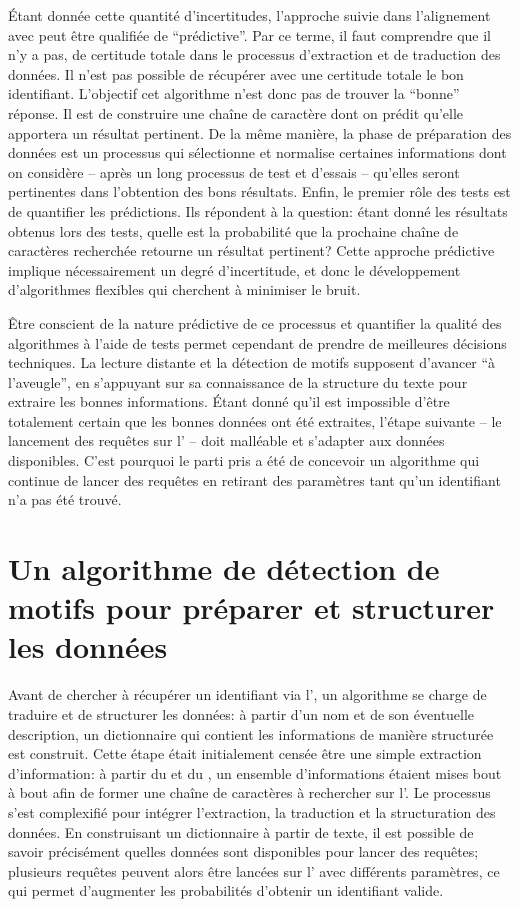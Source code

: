 Étant donnée cette quantité d'incertitudes, l'approche suivie dans l'alignement avec \wkd{} peut être qualifiée de \enquote{prédictive}. Par ce terme, il faut comprendre que il n'y a pas, de certitude totale dans le processus d'extraction et de traduction des données. Il n'est pas possible de récupérer avec une certitude totale le bon identifiant. L'objectif cet algorithme n'est donc pas de trouver la \enquote{bonne} réponse. Il est de construire une chaîne de caractère dont on prédit qu'elle apportera un résultat pertinent. De la même manière, la phase de préparation des données est un processus qui sélectionne et normalise certaines informations dont on considère -- après un long processus de test et d'essais -- qu'elles seront pertinentes dans l'obtention des bons résultats. Enfin, le premier rôle des tests est de quantifier les prédictions. Ils répondent à la question: étant donné les résultats obtenus lors des tests, quelle est la probabilité que la prochaine chaîne de caractères recherchée retourne un résultat pertinent? Cette approche prédictive implique nécessairement un degré d'incertitude, et donc le développement d'algorithmes flexibles qui cherchent à minimiser le bruit. 

Être conscient de la nature prédictive de ce processus et quantifier la qualité des algorithmes à l'aide de tests permet cependant de prendre de meilleures décisions techniques. La lecture distante et la détection de motifs supposent d'avancer \enquote{à l'aveugle}, en s'appuyant sur sa connaissance de la structure du texte pour extraire les bonnes informations. Étant donné qu'il est impossible d'être totalement certain que les bonnes données ont été extraites, l'étape suivante -- le lancement des requêtes sur l'\api{} -- doit malléable et s'adapter aux données disponibles. C'est pourquoi le parti pris a été de concevoir un algorithme qui continue de lancer des requêtes en retirant des paramètres tant qu'un identifiant n'a pas été trouvé.

\section{Un algorithme de détection de motifs pour préparer et structurer les données}
Avant de chercher à récupérer un identifiant \wkd{} via l'\api{}, un algorithme se charge de traduire et de structurer les données: à partir d'un nom et de son éventuelle description, un dictionnaire qui contient les informations de manière structurée est construit. Cette étape était initialement censée être une simple extraction d'information: à partir du \tname{} et du \ttrait{}, un ensemble d'informations étaient mises bout à bout afin de former une chaîne de caractères à rechercher sur l'\api{}. Le processus s'est complexifié pour intégrer l'extraction, la traduction et la structuration des données. En construisant un \gls{dictionnaire} à partir de texte, il est possible de savoir précisément quelles données sont disponibles pour lancer des requêtes; plusieurs requêtes peuvent alors être lancées sur l'\api{} avec différents paramètres, ce qui permet d'augmenter les probabilités d'obtenir un identifiant valide. 

